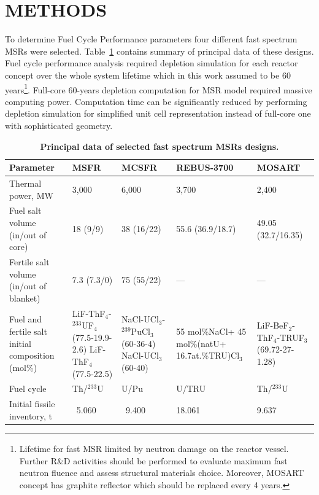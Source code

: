 \documentclass[letterpaper]{mandc2019}
\begin{document}
\section{METHODS} 
\label{sec:methods}
To determine Fuel Cycle Performance parameters four different fast spectrum \glspl{MSR} were selected.  Table~\ref{table:fsmsr_concepts} contains summary of principal data of these designs. Fuel cycle performance analysis required depletion simulation for each reactor concept over the whole system lifetime which in this work assumed to be 60 years\footnote{Lifetime for fast \gls{MSR} limited by neutron damage on the reactor vessel. Further R\&D activities should be performed to evaluate maximum fast neutron fluence  and assess structural materials choice. Moreover, \gls{MOSART} concept has graphite reflector which should be replaced every 4 years.}. Full-core 60-years depletion computation for \gls{MSR} model required massive computing power. Computation time can be significantly reduced by performing depletion simulation for simplified unit cell representation instead of full-core one with sophisticated geometry.
\begin{table}[!htb]
  \centering
  \caption{\bf Principal data of selected fast spectrum \glspl{MSR} designs.}
  \label{table:fsmsr_concepts} 
  \begin{tabular}{|p{}|p{}|p{}|p{}|p{}|} \hline 
   Parameter & \gls{MSFR} & \gls{MCSFR} & REBUS-3700 & \gls{MOSART} \\ \hline
   Thermal power, MW 				&  3,000 & 6,000     & 3,700 & 2,400   \\ \hline
   Fuel salt volume (in/out of core)       &18 (9/9)& 38 (16/22)& 55.6 (36.9/18.7) & 49.05 (32.7/16.35) \\ \hline
   Fertile salt volume (in/out of blanket) & 7.3 (7.3/0) & 75 (55/22)    & --- & --- \\ \hline 
   Fuel and fertile salt initial composition (mol\%) & LiF-ThF$_4$-$^{233}$UF$_4$ (77.5-19.9-2.6) LiF-ThF$_4$ (77.5-22.5) & NaCl-UCl$_3$-$^{239}$PuCl$_3$ (60-36-4) NaCl-UCl$_3$ (60-40)    
   & 55 mol\%NaCl+ 45 mol\%(natU+ 16.7at.\%TRU)Cl$_3$ 
   & LiF-BeF$_2$-ThF$_4$-TRUF$_3$ (69.72-27-1.28) \\ \hline 
   Fuel cycle & Th/$^{233}$U & U/Pu  & U/TRU & Th/$^{233}$U \\ \hline 
   Initial fissile inventory, t & \ 5.060 & \ 9.400    & 18.061 & 9.637 \\ \hline 
  \end{tabular}
\end{table}
\end{document}
